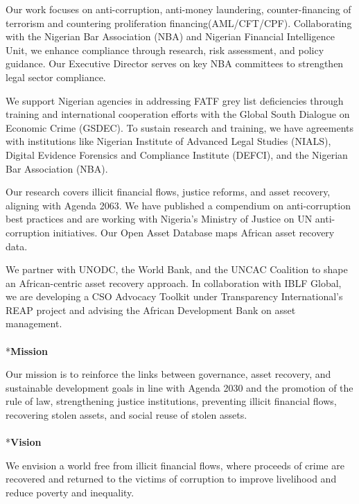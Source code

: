 \documentclass[
  letterpaper,
  DIV=11,
  numbers=noendperiod]{scrreprt}
\makeatletter
\let\oldparagraph\paragraph
\renewcommand{\paragraph}{
    \@ifstar
      \xxxParagraphStar
      \xxxParagraphNoStar
  }
\newcommand{\xxxParagraphStar}[1]{\oldparagraph*{#1}\mbox{}}
\newcommand{\xxxParagraphNoStar}[1]{\oldparagraph{#1}\mbox{}}
\makeatother
\begin{document}
Our work focuses on anti-corruption, anti-money laundering,
counter-financing of terrorism and countering proliferation
financing(AML/CFT/CPF). Collaborating with the Nigerian Bar Association
(NBA) and Nigerian Financial Intelligence Unit, we enhance compliance
through research, risk assessment, and policy guidance. Our Executive
Director serves on key NBA committees to strengthen legal sector
compliance.

We support Nigerian agencies in addressing FATF grey list deficiencies
through training and international cooperation efforts with the Global
South Dialogue on Economic Crime (GSDEC). To sustain research and
training, we have agreements with institutions like Nigerian Institute
of Advanced Legal Studies (NIALS), Digital Evidence Forensics and
Compliance Institute (DEFCI), and the Nigerian Bar Association (NBA).

Our research covers illicit financial flows, justice reforms, and asset
recovery, aligning with Agenda 2063. We have published a compendium on
anti-corruption best practices and are working with Nigeria's Ministry
of Justice on UN anti-corruption initiatives. Our Open Asset Database
maps African asset recovery data.

We partner with UNODC, the World Bank, and the UNCAC Coalition to shape
an African-centric asset recovery approach. In collaboration with IBLF
Global, we are developing a CSO Advocacy Toolkit under Transparency
International's REAP project and advising the African Development Bank
on asset management.

\paragraph*{\texorpdfstring{\textbf{Mission}}{Mission}}\label{mission}

Our mission is to reinforce the links between governance, asset
recovery, and sustainable development goals in line with Agenda 2030 and
the promotion of the rule of law, strengthening justice institutions,
preventing illicit financial flows, recovering stolen assets, and social
reuse of stolen assets.

\paragraph*{\texorpdfstring{\textbf{Vision}}{Vision}}\label{vision}

We envision a world free from illicit financial flows, where proceeds of
crime are recovered and returned to the victims of corruption to improve
livelihood and reduce poverty and inequality.~
\end{document}
